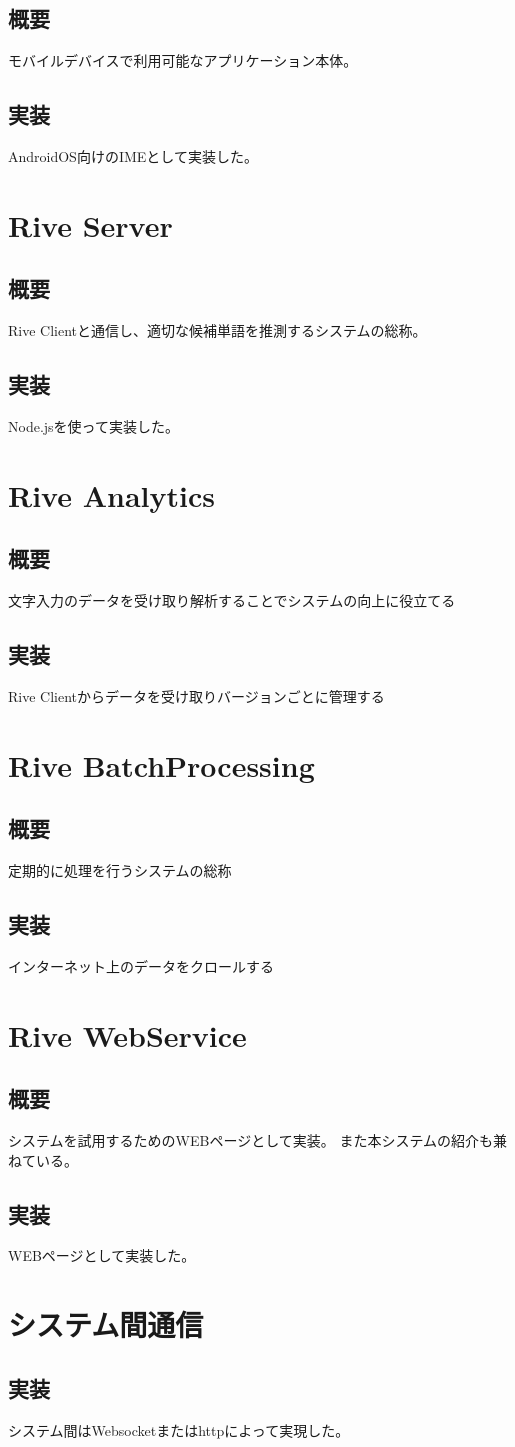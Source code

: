 \subsection{概要}
モバイルデバイスで利用可能なアプリケーション本体。
\subsection{実装}
AndroidOS\cite{android}向けのIMEとして実装した。


\section{Rive Server}
\subsection{概要}
Rive Clientと通信し、適切な候補単語を推測するシステムの総称。

\subsection{実装}
Node.js\cite{nodejs}を使って実装した。

\section{Rive Analytics}
\subsection{概要}
文字入力のデータを受け取り解析することでシステムの向上に役立てる
\subsection{実装}
Rive Clientからデータを受け取りバージョンごとに管理する

\section{Rive BatchProcessing}
\subsection{概要}
定期的に処理を行うシステムの総称
\subsection{実装}
インターネット上のデータをクロールする

\section{Rive WebService}
\subsection{概要}
システムを試用するためのWEBページとして実装。
また本システムの紹介も兼ねている。
\subsection{実装}
WEBページとして実装した。

\section{システム間通信}
\subsection{実装}
システム間はWebsocketまたはhttpによって実現した。
